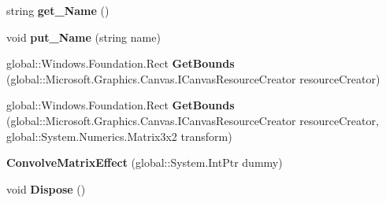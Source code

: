 \begin{DoxyCompactItemize}
\item 
\mbox{\label{class_microsoft_1_1_graphics_1_1_canvas_1_1_effects_1_1_convolve_matrix_effect_a1184f0aca4a0272ce95920ec83f0ba16}} 
string {\bfseries get\+\_\+\+Name} ()
\item 
\mbox{\label{class_microsoft_1_1_graphics_1_1_canvas_1_1_effects_1_1_convolve_matrix_effect_aeafe2515764ea10a75253b073810b457}} 
void {\bfseries put\+\_\+\+Name} (string name)
\item 
\mbox{\label{class_microsoft_1_1_graphics_1_1_canvas_1_1_effects_1_1_convolve_matrix_effect_a4447c7b37ba50f6a56fcab8c7162ef14}} 
global\+::\+Windows.\+Foundation.\+Rect {\bfseries Get\+Bounds} (global\+::\+Microsoft.\+Graphics.\+Canvas.\+I\+Canvas\+Resource\+Creator resource\+Creator)
\item 
\mbox{\label{class_microsoft_1_1_graphics_1_1_canvas_1_1_effects_1_1_convolve_matrix_effect_a9217d8a4ac41858e50073c043f56fb29}} 
global\+::\+Windows.\+Foundation.\+Rect {\bfseries Get\+Bounds} (global\+::\+Microsoft.\+Graphics.\+Canvas.\+I\+Canvas\+Resource\+Creator resource\+Creator, global\+::\+System.\+Numerics.\+Matrix3x2 transform)
\item 
\mbox{\label{class_microsoft_1_1_graphics_1_1_canvas_1_1_effects_1_1_convolve_matrix_effect_a5b7d51fb8ea576cdec1344b34f9bf8ff}} 
{\bfseries Convolve\+Matrix\+Effect} (global\+::\+System.\+Int\+Ptr dummy)
\item 
\mbox{\label{class_microsoft_1_1_graphics_1_1_canvas_1_1_effects_1_1_convolve_matrix_effect_ade7c5a61826ba4eb1335c485b77bb198}} 
void {\bfseries Dispose} ()
\item 
\mbox{\label{class_microsoft_1_1_graphics_1_1_canvas_1_1_effects_1_1_convolve_matrix_effect_a6d9159be1d73df73a313b7b99727f4e7}} 

\end{DoxyCompactItemize}
